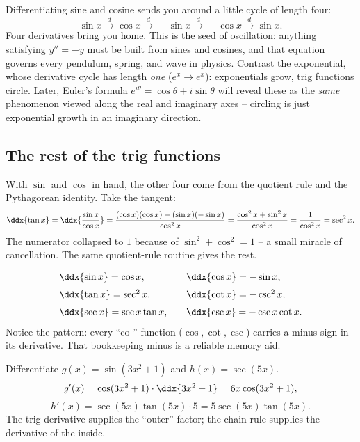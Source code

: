 \begin{aestheticbox}
Differentiating sine and cosine sends you around a little cycle of length
four:
\[
   \sin x \xrightarrow{\;d\;} \cos x \xrightarrow{\;d\;} -\sin x
   \xrightarrow{\;d\;} -\cos x \xrightarrow{\;d\;} \sin x.
\]
Four derivatives bring you home. This is the seed of oscillation: anything
satisfying $y'' = -y$ must be built from sines and cosines, and that
equation governs every pendulum, spring, and wave in physics. Contrast the
exponential, whose derivative cycle has length \emph{one} ($e^x\to e^x$):
exponentials grow, trig functions circle. Later, Euler's formula
$e^{i\theta}=\cos\theta + i\sin\theta$ will reveal these as the \emph{same}
phenomenon viewed along the real and imaginary axes -- circling is just
exponential growth in an imaginary direction.
\end{aestheticbox}

\subsection{The rest of the trig functions}

With $\sin$ and $\cos$ in hand, the other four come from the quotient rule
and the Pythagorean identity. Take the tangent:
\[
   \ddx{\tan x}
   = \ddx{\frac{\sin x}{\cos x}}
   = \frac{(\cos x)(\cos x) - (\sin x)(-\sin x)}{\cos^2 x}
   = \frac{\cos^2 x + \sin^2 x}{\cos^2 x}
   = \frac{1}{\cos^2 x} = \sec^2 x.
\]
The numerator collapsed to $1$ because of $\sin^2+\cos^2=1$ -- a small
miracle of cancellation. The same quotient-rule routine gives the rest.

\begin{focusbox}
\[
\begin{array}{ll}
\ddx{\sin x} = \cos x, &\quad \ddx{\cos x} = -\sin x, \\[6pt]
\ddx{\tan x} = \sec^2 x, &\quad \ddx{\cot x} = -\csc^2 x, \\[6pt]
\ddx{\sec x} = \sec x\tan x, &\quad \ddx{\csc x} = -\csc x\cot x.
\end{array}
\]
Notice the pattern: every ``co-'' function ($\cos,\cot,\csc$) carries a minus
sign in its derivative. That bookkeeping minus is a reliable memory aid.
\end{focusbox}

\begin{example}
\label{ch12:ex-chain-trig}
Differentiate $g(x) = \sin(3x^2+1)$ and $h(x)=\sec(5x)$.
\[
   g'(x) = \cos(3x^2+1)\cdot \ddx{3x^2+1} = 6x\cos(3x^2+1),
\]
\[
   h'(x) = \sec(5x)\tan(5x)\cdot 5 = 5\sec(5x)\tan(5x).
\]
The trig derivative supplies the ``outer'' factor; the chain rule supplies
the derivative of the inside.
\end{example}

